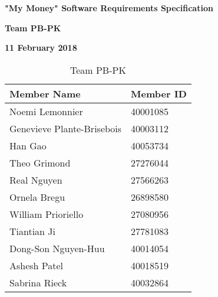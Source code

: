 \documentclass[12pt]{article}
\begin{document}
\pagestyle{plain}
\vspace*{0.5in}
\centerline{\bf\Large "My Money" Software Requirements Specification}

\vspace*{0.5in}
\centerline{\bf\Large Team PB-PK}

\vspace*{0.5in}
\centerline{\bf\Large 11 February 2018}

\vspace*{1.0in}
\begin{table}[ht]


\begin{center}
\begin{tabular}{|l | l |}
\hline
\textbf{Member Name} & \textbf{Member ID} \\

\hline Noemi Lemonnier & 40001085 \\ \hline Genevieve Plante-Brisebois & 40003112 \\ \hline Han Gao & 40053734 \\
\hline Theo	Grimond & 27276044 \\ \hline Real	Nguyen & 27566263 \\ \hline Ornela Bregu & 26898580 \\
\hline William	Prioriello & 27080956 \\ \hline Tiantian	Ji & 27781083 \\ \hline Dong-Son Nguyen-Huu & 40014054  \\
\hline Ashesh Patel & 40018519 \\ \hline Sabrina	Rieck & 40032864 \\

\hline
\end{tabular}
\caption{Team PB-PK}
\end{center}
\end{table}

\clearpage
\end{document}
